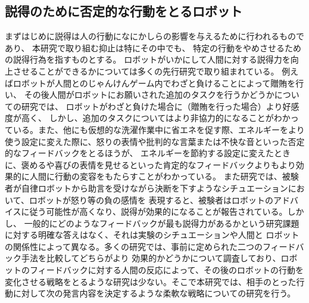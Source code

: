 \documentclass{kuisthesis}
\begin{document}
\subsection{説得のために否定的な行動をとるロボット}
まずはじめに説得は人の行動になにかしらの影響を与えるために行われるものであり、
本研究で取り組む抑止は特にその中でも、
特定の行動をやめさせるための説得行為を指すものとする。
ロボットがいかにして人間に対する説得力を向上させることができるかについては多くの先行研究で取り組まれている。
例えばロボットが人間とのじゃんけんゲーム内でわざと負けることによって贈賄を行い、
その後人間がロボットにお願いされた追加のタスクを行うかどうかについての研究\cite{sandoval2016can}では、
ロボットがわざと負けた場合に（贈賄を行った場合）より好感度が高く、
しかし、追加のタスクについてはより非協力的になることがわかっている。また、他にも仮想的な洗濯作業中に省エネを促す際、エネルギーをより使う設定に変えた際に、怒りの表情や批判的な言葉または不快な音といった否定的なフィードバックをとるほうが、
エネルギーを節約する設定に変えたときに、褒めるや喜びの表情を見せるといった肯定的なフィードバックよりもより効果的に人間に行動の変容をもたらすことがわかっている\cite{Midden2009}。
また研究\cite{paradeda2019makes}では、被験者が自律ロボットから助言を受けながら決断を下すようなシチュエーションにおいて、ロボットが怒り等の負の感情を
表現すると、被験者はロボットのアドバイスに従う可能性が高くなり、説得が効果的になることが報告されている。しかし、
一般的にどのようなフィードバックが最も説得力があるかという研究課題に対する明確な答えはなく、それは実験のシチュエーションや人間と
ロボットの関係性によって異なる。多くの研究では、事前に定められた二つのフィードバック手法を比較してどちらがより
効果的かどうかについて調査しており、ロボットのフィードバックに対する人間の反応によって、その後のロボットの行動を
変化させる戦略をとるような研究は少ない。そこで本研究では、相手のとった行動に対して次の発言内容を決定するような柔軟な戦略についての研究を行う。
\end{document}
